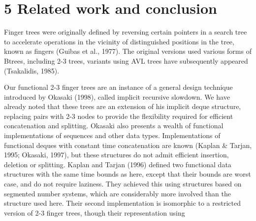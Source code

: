 \documentclass[10pt]{article}
\begin{document}
\section*{5 Related work and conclusion}
Finger trees were originally defined by reversing certain pointers in a search tree to accelerate operations in the vicinity of distinguished positions in the tree, known as fingers (Guibas et al., 1977). The original versions used various forms of Btrees, including 2-3 trees, variants using AVL trees have subsequently appeared (Tsakalidis, 1985).

Our functional 2-3 finger trees are an instance of a general design technique introduced by Okasaki (1998), called implicit recursive slowdown. We have already noted that these trees are an extension of his implicit deque structure, replacing pairs with 2-3 nodes to provide the flexibility required for efficient concatenation and splitting. Okasaki also presents a wealth of functional implementations of sequences and other data types. Implementations of functional deques with constant time concatenation are known (Kaplan \& Tarjan, 1995; Okasaki, 1997), but these structures do not admit efficient insertion, deletion or splitting. Kaplan and Tarjan (1996) defined two functional data structures with the same time bounds as here, except that their bounds are worst case, and do not require laziness. They achieved this using structures based on segmented number systems, which are considerably more involved than the structure used here. Their second implementation is isomorphic to a restricted version of 2-3 finger trees, though their representation using
\end{document}

